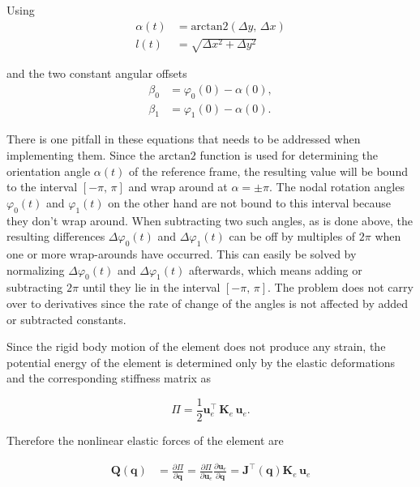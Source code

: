 Using
%
\begin{align}
\alpha(t) &= \mathrm{arctan2}\left(\Delta y,\,\Delta x\right) \\
l(t) &= \sqrt{\Delta x^2 + \Delta y^2}
\end{align}

and the two constant angular offsets
%
\begin{align}
\beta_0 &= \varphi_0(0) - \alpha(0), \\
\beta_1 &= \varphi_1(0) - \alpha(0).
\end{align}

There is one pitfall in these equations that needs to be addressed when implementing them.
Since the $\mathrm{arctan2}$ function is used for determining the orientation angle $\alpha(t)$ of the reference frame, the resulting value will be bound to the interval $[-\pi,\,\pi]$ and wrap around at $\alpha = \pm\pi$.
The nodal rotation angles $\varphi_0(t)$ and $\varphi_1(t)$ on the other hand are not bound to this interval because they don't wrap around.
When subtracting two such angles, as is done above, the resulting differences $\Delta \varphi_0(t)$ and $\Delta \varphi_1(t)$ can be off by multiples of $2\pi$ when one or more wrap-arounds have occurred.
This can easily be solved by normalizing $\Delta \varphi_0(t)$ and $\Delta \varphi_1(t)$ afterwards, which means adding or subtracting $2\pi$ until they lie in the interval $[-\pi,\,\pi]$.
The problem does not carry over to derivatives since the rate of change of the angles is not affected by added or subtracted constants.

Since the rigid body motion of the element does not produce any strain, the potential energy of the element is determined only by the elastic deformations and the corresponding stiffness matrix as

\begin{equation}
\Pi = \frac{1}{2}\boldsymbol{u}_{e}^\intercal\,\boldsymbol{K}_{e}\,\boldsymbol{u}_{e}.
\end{equation}

Therefore the nonlinear elastic forces of the element are

\begin{align}
\boldsymbol{Q}(\boldsymbol{q}) &= \frac{\partial\Pi}{\partial\boldsymbol{q}} = \frac{\partial\Pi}{\partial\boldsymbol{u}_e}\frac{\partial\boldsymbol{u}_e}{\partial\boldsymbol{q}} = \boldsymbol{J}^\intercal(\boldsymbol{q})\boldsymbol{K}_{e}\,\boldsymbol{u}_{e}
\end{align}


